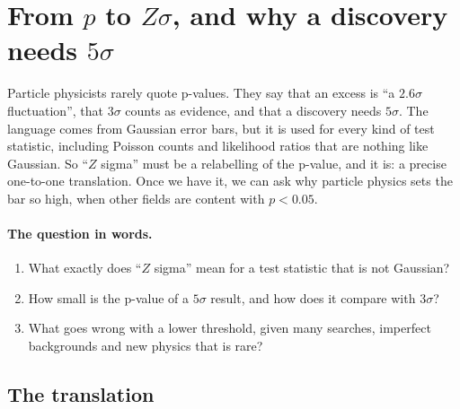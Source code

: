 \section{From $p$ to $Z\sigma$, and why a discovery needs $5\sigma$}
\label{4a:sec:ztable}

Particle physicists rarely quote p-values. They say that an excess is ``a
$2.6\sigma$ fluctuation'', that $3\sigma$ counts as evidence, and that a
discovery needs $5\sigma$. The language comes from Gaussian error bars, but it
is used for every kind of test statistic, including Poisson counts and
likelihood ratios that are nothing like Gaussian. So ``$Z$ sigma'' must be a
relabelling of the p-value, and it is: a precise one-to-one translation. Once
we have it, we can ask why particle physics sets the bar so high, when other
fields are content with $p<0.05$.

\paragraph{The question in words.}
\begin{enumerate}[label=\arabic*.]
  \item What exactly does ``$Z$ sigma'' mean for a test statistic that is not
        Gaussian?
  \item How small is the p-value of a $5\sigma$ result, and how does it
        compare with $3\sigma$?
  \item What goes wrong with a lower threshold, given many searches, imperfect
        backgrounds and new physics that is rare?
\end{enumerate}

\subsection{The translation}
\label{4a:sec:p-to-z}

